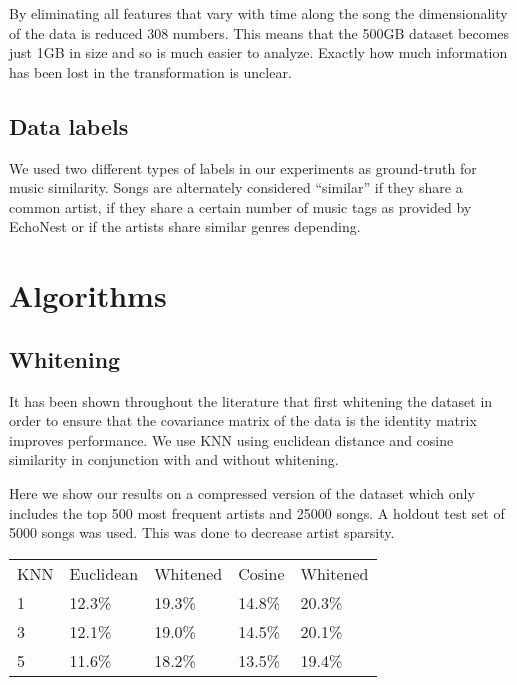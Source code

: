 \documentclass[a4paper,10pt]{article}
\begin{document}
By eliminating all features that vary with time along the song the dimensionality of the data is reduced 308 numbers. This means that the 500GB dataset becomes just 1GB in size and so is much easier to analyze. Exactly how much information has been lost in the transformation is unclear. 
\subsection{Data labels}
We used two different types of labels in our experiments as ground-truth for music similarity. Songs are alternately considered ``similar'' if they share a common artist, if they share a certain number of music tags as provided by EchoNest or if the artists share similar genres depending.
\section{Algorithms}
\subsection{Whitening}
It has been shown throughout the literature that first whitening the dataset in order to ensure that the covariance matrix of the data is the identity matrix improves performance. We use KNN using euclidean distance and cosine similarity in conjunction with and without whitening. 

Here we show our results on a compressed version of the dataset which only includes the top 500 most frequent artists and 25000 songs. A holdout test set of 5000 songs was used. This was done to decrease artist sparsity.
\begin{center}
\begin{tabular}{lllll}
KNN & Euclidean & Whitened & Cosine & Whitened\\
1 & 12.3\% & 19.3\% & 14.8\% & 20.3\%\\
3 & 12.1\% & 19.0\% & 14.5\% & 20.1\% \\
5 & 11.6\% & 18.2\% & 13.5\% & 19.4\% 
\end{tabular}
\end{center}

{}
\end{document}
